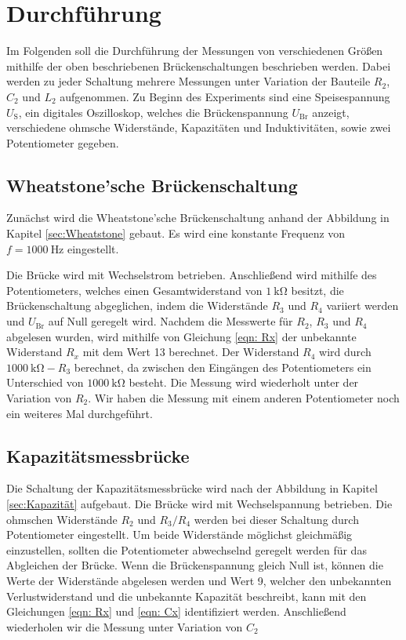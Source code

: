 \section{Durchführung} \label{sec:Durchführung}

    Im Folgenden soll die Durchführung der Messungen von verschiedenen Größen mithilfe der oben beschriebenen
    Brückenschaltungen beschrieben werden.
    Dabei werden zu jeder Schaltung mehrere Messungen unter Variation der Bauteile
    $R_2$, $C_2$ und $L_2$ aufgenommen.
    Zu Beginn des Experiments sind eine Speisespannung $U_\text{S}$, ein digitales Oszilloskop, welches die
    Brückenspannung $U_\text{Br}$ anzeigt, verschiedene ohmsche Widerstände, Kapazitäten und Induktivitäten, sowie
    zwei Potentiometer gegeben.

\subsection{Wheatstone'sche Brückenschaltung}

    Zunächst wird die Wheatstone'sche Brückenschaltung anhand der Abbildung in Kapitel \ref{sec:Wheatstone} gebaut.
    Es wird eine konstante Frequenz von $f = \SI{1000}{\hertz}$ eingestellt.

    Die Brücke wird mit Wechselstrom betrieben.
    Anschließend wird mithilfe des Potentiometers, welches einen Gesamtwiderstand von $\SI{1}{\kilo\ohm}$ besitzt,
    die Brückenschaltung abgeglichen, indem
    die Widerstände $R_3$ und $R_4$ variiert werden und $U_\text{Br}$ auf Null geregelt wird.
    Nachdem die Messwerte für $R_2$, $R_3$ und $R_4$ abgelesen wurden, wird mithilfe von Gleichung \eqref{eqn: Rx}
    der unbekannte Widerstand $R_x$ mit dem Wert 13 berechnet.
    Der Widerstand $R_4$ wird durch $\SI{1000}{\kilo\ohm}-R_3$ berechnet, da zwischen den Eingängen des
    Potentiometers ein Unterschied von $\SI{1000}{\kilo\ohm}$ besteht.
    Die Messung wird wiederholt unter der Variation von $R_2$.
    Wir haben die Messung mit einem anderen Potentiometer noch ein weiteres Mal durchgeführt.

\subsection{Kapazitätsmessbrücke}

    Die Schaltung der Kapazitätsmessbrücke wird nach der Abbildung in Kapitel \ref{sec:Kapazität} aufgebaut.
    Die Brücke wird mit Wechselspannung betrieben.
    Die ohmschen Widerstände $R_2$ und $R_3/R_4$ werden bei dieser Schaltung durch Potentiometer eingestellt.
    Um beide Widerstände möglichst gleichmäßig einzustellen, sollten die Potentiometer abwechselnd geregelt werden
    für das Abgleichen der Brücke.
    Wenn die Brückenspannung gleich Null ist, können die Werte der Widerstände abgelesen werden und Wert 9,
    welcher den unbekannten Verlustwiderstand und die unbekannte Kapazität beschreibt, kann mit den Gleichungen 
    \eqref{eqn: Rx} und \eqref{eqn: Cx} identifiziert werden.
    Anschließend wiederholen wir die Messung unter Variation von $C_2$ 

